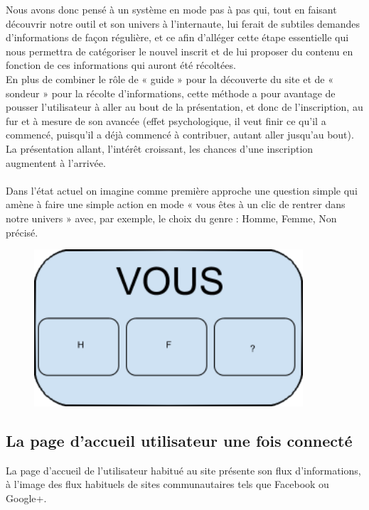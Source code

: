 \documentclass{life-fr}
\begin{document}
Nous avons donc pensé à un système en mode pas à pas qui, tout en faisant découvrir notre outil et son univers à l'internaute, lui ferait de subtiles demandes d'informations de façon régulière, et ce afin d'alléger cette étape essentielle qui nous permettra de catégoriser le nouvel inscrit et de lui proposer du contenu en fonction de ces informations qui auront été récoltées.\\

En plus de combiner le rôle de « guide » pour la découverte du site et de « sondeur » pour la récolte d'informations, cette méthode a pour avantage de pousser l'utilisateur à aller au bout de la présentation, et donc de l'inscription, au fur et à mesure de son avancée (effet psychologique, il veut finir ce qu'il a commencé, puisqu'il a déjà commencé à contribuer, autant aller jusqu'au bout). La présentation allant, l'intérêt croissant, les chances d'une inscription augmentent à l'arrivée.\\
\\

Dans l'état actuel on imagine comme première approche une question simple qui amène à faire une simple action en mode « vous êtes à un clic de rentrer dans notre univers » avec, par exemple, le choix du genre : Homme, Femme, Non précisé.

\begin{figure}[H]
  \begin{center}
    \includegraphics[width=10cm]{img/vous.png}
  \end{center}
\end{figure}

\subsection{La page d'accueil utilisateur une fois connecté}

La page d'accueil de l'utilisateur habitué au site présente son flux d'informations, à l'image des flux habituels de sites communautaires tels que Facebook ou Google+. \\
\end{document}

